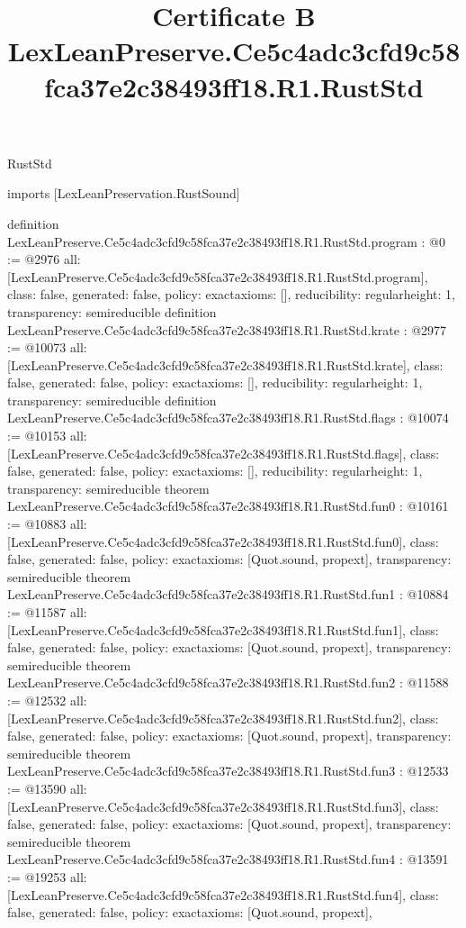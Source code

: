 \begin{lexlean}{RustStd}
\title{Certificate B LexLeanPreserve.Ce5c4adc3cfd9c58fca37e2c38493ff18.R1.RustStd}
\begin{coremodule}
imports [LexLeanPreservation.RustSound]

definition LexLeanPreserve.Ce5c4adc3cfd9c58fca37e2c38493ff18.R1.RustStd.program : @0 := @2976 {
  all: [LexLeanPreserve.Ce5c4adc3cfd9c58fca37e2c38493ff18.R1.RustStd.program],
  class: false,
  generated: false,
  policy: exact{axioms: []},
  reducibility: regular{height: 1},
  transparency: semireducible
}
definition LexLeanPreserve.Ce5c4adc3cfd9c58fca37e2c38493ff18.R1.RustStd.krate : @2977 := @10073 {
  all: [LexLeanPreserve.Ce5c4adc3cfd9c58fca37e2c38493ff18.R1.RustStd.krate],
  class: false,
  generated: false,
  policy: exact{axioms: []},
  reducibility: regular{height: 1},
  transparency: semireducible
}
definition LexLeanPreserve.Ce5c4adc3cfd9c58fca37e2c38493ff18.R1.RustStd.flags : @10074 := @10153 {
  all: [LexLeanPreserve.Ce5c4adc3cfd9c58fca37e2c38493ff18.R1.RustStd.flags],
  class: false,
  generated: false,
  policy: exact{axioms: []},
  reducibility: regular{height: 1},
  transparency: semireducible
}
theorem LexLeanPreserve.Ce5c4adc3cfd9c58fca37e2c38493ff18.R1.RustStd.fun0 : @10161 := @10883 {
  all: [LexLeanPreserve.Ce5c4adc3cfd9c58fca37e2c38493ff18.R1.RustStd.fun0],
  class: false,
  generated: false,
  policy: exact{axioms: [Quot.sound, propext]},
  transparency: semireducible
}
theorem LexLeanPreserve.Ce5c4adc3cfd9c58fca37e2c38493ff18.R1.RustStd.fun1 : @10884 := @11587 {
  all: [LexLeanPreserve.Ce5c4adc3cfd9c58fca37e2c38493ff18.R1.RustStd.fun1],
  class: false,
  generated: false,
  policy: exact{axioms: [Quot.sound, propext]},
  transparency: semireducible
}
theorem LexLeanPreserve.Ce5c4adc3cfd9c58fca37e2c38493ff18.R1.RustStd.fun2 : @11588 := @12532 {
  all: [LexLeanPreserve.Ce5c4adc3cfd9c58fca37e2c38493ff18.R1.RustStd.fun2],
  class: false,
  generated: false,
  policy: exact{axioms: [Quot.sound, propext]},
  transparency: semireducible
}
theorem LexLeanPreserve.Ce5c4adc3cfd9c58fca37e2c38493ff18.R1.RustStd.fun3 : @12533 := @13590 {
  all: [LexLeanPreserve.Ce5c4adc3cfd9c58fca37e2c38493ff18.R1.RustStd.fun3],
  class: false,
  generated: false,
  policy: exact{axioms: [Quot.sound, propext]},
  transparency: semireducible
}
theorem LexLeanPreserve.Ce5c4adc3cfd9c58fca37e2c38493ff18.R1.RustStd.fun4 : @13591 := @19253 {
  all: [LexLeanPreserve.Ce5c4adc3cfd9c58fca37e2c38493ff18.R1.RustStd.fun4],
  class: false,
  generated: false,
  policy: exact{axioms: [Quot.sound, propext]},
}
\end{coremodule}
\end{lexlean}
